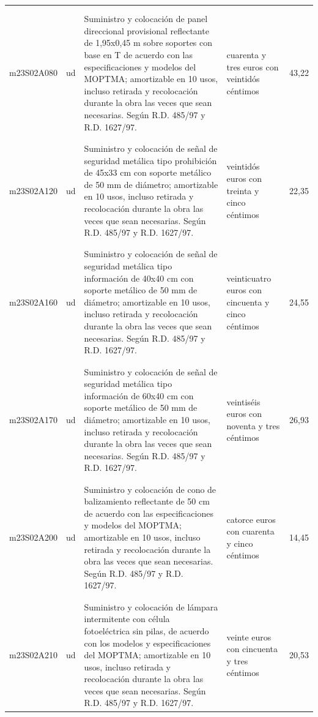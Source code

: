 \documentclass{book}%
\begin{document}
\begin{longtable}{|l|l|p{5cm}|p{3cm}|r|}
&&&&\\%
&&&&\\%
m23S02A080&ud&Suministro y colocación de panel direccional provisional reflectante de 1,95x0,45 m sobre soportes con base en T de acuerdo con las especificaciones y modelos del MOPTMA; amortizable en 10 usos, incluso retirada y recolocación durante la obra las veces que sean necesarias. Según R.D. 485/97 y R.D. 1627/97.&cuarenta y tres euros con veintidós céntimos&43,22\\%
&&&&\\%
&&&&\\%
m23S02A120&ud&Suministro y colocación de señal de seguridad metálica tipo prohibición de 45x33 cm con soporte metálico de 50 mm de diámetro; amortizable en 10 usos, incluso retirada y recolocación durante la obra las veces que sean necesarias. Según R.D. 485/97 y R.D. 1627/97.&veintidós euros con treinta y cinco céntimos&22,35\\%
&&&&\\%
&&&&\\%
m23S02A160&ud&Suministro y colocación de señal de seguridad metálica tipo información de 40x40 cm con soporte metálico de 50 mm de diámetro; amortizable en 10 usos, incluso retirada y recolocación durante la obra las veces que sean necesarias. Según R.D. 485/97 y R.D. 1627/97.&veinticuatro euros con cincuenta y cinco céntimos&24,55\\%
&&&&\\%
&&&&\\%
m23S02A170&ud&Suministro y colocación de señal de seguridad metálica tipo información de 60x40 cm con soporte metálico de 50 mm de diámetro; amortizable en 10 usos, incluso retirada y recolocación durante la obra las veces que sean necesarias. Según R.D. 485/97 y R.D. 1627/97.&veintiséis euros con noventa y tres céntimos&26,93\\%
&&&&\\%
&&&&\\%
m23S02A200&ud&Suministro y colocación de cono de balizamiento reflectante de 50 cm de acuerdo con las especificaciones y modelos del MOPTMA; amortizable en 10 usos, incluso retirada y recolocación durante la obra las veces que sean necesarias. Según R.D. 485/97 y R.D. 1627/97.&catorce euros con cuarenta y cinco céntimos&14,45\\%
&&&&\\%
&&&&\\%
m23S02A210&ud&Suministro y colocación de lámpara intermitente con célula fotoeléctrica sin pilas, de acuerdo con los modelos y especificaciones del MOPTMA; amortizable en 10 usos, incluso retirada y recolocación durante la obra las veces que sean necesarias. Según R.D. 485/97 y R.D. 1627/97.&veinte euros con cincuenta y tres céntimos&20,53\\%

\end{longtable}
\end{document}
